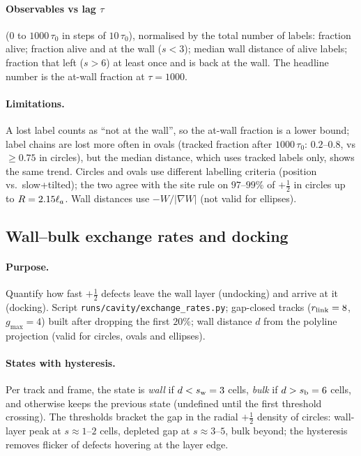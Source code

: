 \paragraph{Observables vs lag $\tau$} ($0$ to $1000\,\tau_0$ in steps of $10\,\tau_0$), normalised by the total number of labels:
fraction alive; fraction alive and at the wall ($s<3$); median wall distance of alive labels; fraction that left ($s>6$) at least once and
is back at the wall. The headline number is the at-wall fraction at $\tau=1000$.

\paragraph{Limitations.} A lost label counts as ``not at the wall'', so the at-wall fraction is a lower bound; label chains are lost more
often in ovals (tracked fraction after $1000\,\tau_0$: $0.2$--$0.8$, vs $\ge0.75$ in circles), but the median distance, which uses tracked
labels only, shows the same trend. Circles and ovals use different labelling criteria (position vs.\ slow+tilted); the two agree with the
site rule on $97$--$99\%$ of $+\tfrac12$ in circles up to $R=2.15\ell_a$. Wall distances use $-W/|\nabla W|$ (not valid for ellipses).

\subsection{Wall--bulk exchange rates and docking}
\label{sec:md-exchange}

\paragraph{Purpose.} Quantify how fast $+\tfrac12$ defects leave the wall layer (undocking) and arrive at it (docking). Script
\texttt{runs/cavity/exchange\_rates.py}; gap-closed tracks ($r_{\rm link}=8$, $g_{\max}=4$) built after dropping the first $20\%$; wall
distance $d$ from the polyline projection (valid for circles, ovals and ellipses).

\paragraph{States with hysteresis.} Per track and frame, the state is \emph{wall} if $d<s_{\rm w}=3$ cells, \emph{bulk} if $d>s_{\rm b}=6$
cells, and otherwise keeps the previous state (undefined until the first threshold crossing). The thresholds bracket the gap in the radial
$+\tfrac12$ density of circles: wall-layer peak at $s\approx1$--$2$ cells, depleted gap at $s\approx3$--$5$, bulk beyond; the hysteresis
removes flicker of defects hovering at the layer edge.

